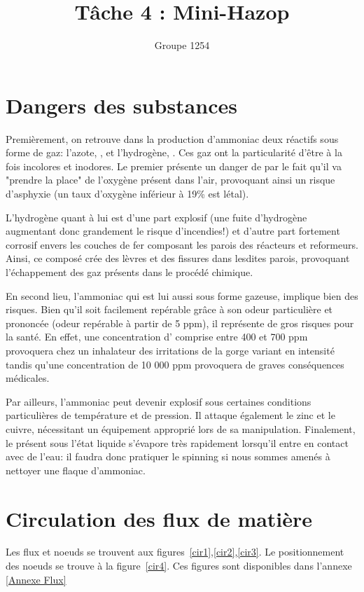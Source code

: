 \documentclass[a4paper,12pt, oneside]{article}
\title{Tâche 4 : Mini-Hazop}
\author{Groupe 1254}
\begin{document}
\maketitle
\section{Dangers des substances}
Premièrement, on retrouve dans la production d'ammoniac deux réactifs sous forme de gaz: l'azote, , et l'hydrogène, . Ces gaz ont la particularité d'être à la fois incolores et inodores. Le premier présente un danger de par le fait qu'il va "prendre la place" de l'oxygène présent dans l'air, provoquant ainsi un risque d'asphyxie (un taux d'oxygène inférieur à 19\% est létal). 
		
		L'hydrogène quant à lui est d'une part explosif (une fuite d'hydrogène augmentant donc grandement le risque d'incendies!) et d'autre part fortement corrosif envers les couches de fer composant les parois des réacteurs et reformeurs. Ainsi, ce composé crée des lèvres et des fissures dans lesdites parois, provoquant l'échappement des gaz présents dans le procédé chimique.
		
		En second lieu, l'ammoniac qui est lui aussi sous forme gazeuse, implique bien des risques. Bien qu'il soit facilement repérable grâce à son odeur particulière et prononcée (odeur repérable à partir de 5 ppm), il représente de gros risques pour la santé. En effet, une concentration d' comprise entre 400 et 700 ppm provoquera chez un inhalateur des irritations de la gorge variant en intensité tandis qu'une concentration de 10 000 ppm provoquera de graves conséquences médicales.

		Par ailleurs, l'ammoniac peut devenir explosif sous certaines conditions particulières de température et de pression. Il attaque également le zinc et le cuivre, nécessitant un équipement approprié lors de sa manipulation. Finalement, le  présent sous l'état liquide s'évapore très rapidement lorsqu'il entre en contact avec de l'eau: il faudra donc pratiquer le spinning si nous sommes amenés à nettoyer une  flaque d'ammoniac.

\section{Circulation des flux de matière}  


Les flux et noeuds se trouvent aux figures~\ref{cir1},\ref{cir2},\ref{cir3}.
Le positionnement des noeuds se trouve à la figure~\ref{cir4}. Ces figures sont disponibles dans l'annexe \ref{Annexe Flux}
\end{document}
